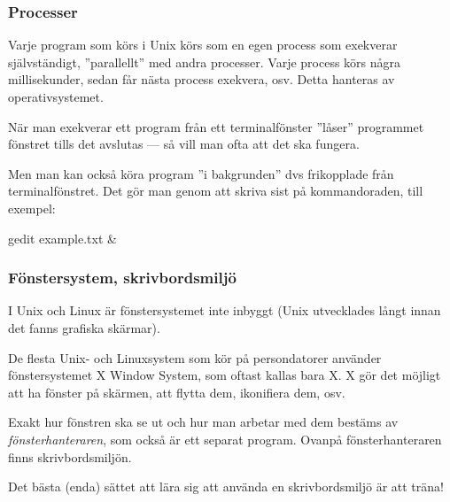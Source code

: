 \begin{frame}[fragile=singleslide]
    \frametitle{Processer}
    Varje program som körs i Unix körs som en egen process som exekverar självständigt, ''parallellt'' med andra processer. Varje process körs några millisekunder, sedan får nästa process exekvera, osv. Detta hanteras av operativsystemet.

    \pindent När man exekverar ett program från ett terminalfönster ''låser'' programmet fönstret tills det avslutas --- så vill man ofta att det ska fungera.

    \pindent Men man kan också köra program ''i bakgrunden'' dvs frikopplade från terminalfönstret. Det gör man genom att skriva \code{\&} sist på kommandoraden, till exempel:

    \begin{Code}
        gedit example.txt &
    \end{Code}

\end{frame}

\begin{frame}[fragile=singleslide]
    \frametitle{Fönstersystem, skrivbordsmiljö}
    I Unix och Linux är fönstersystemet inte inbyggt (Unix utvecklades långt innan det fanns grafiska skärmar).

    \pindent De flesta Unix- och Linuxsystem som kör på persondatorer använder fönstersystemet X Window System, som oftast kallas bara X. X gör det möjligt att ha fönster på skärmen, att flytta dem, ikonifiera dem, osv.

    \pindent Exakt hur fönstren ska se ut och hur man arbetar med dem bestäms av \emph{fönsterhanteraren}, som också är ett separat program. Ovanpå fönsterhanteraren finns skrivbordsmiljön.

    \pindent Det bästa (enda) sättet att lära sig att använda en skrivbordsmiljö är att träna!
\end{frame}

